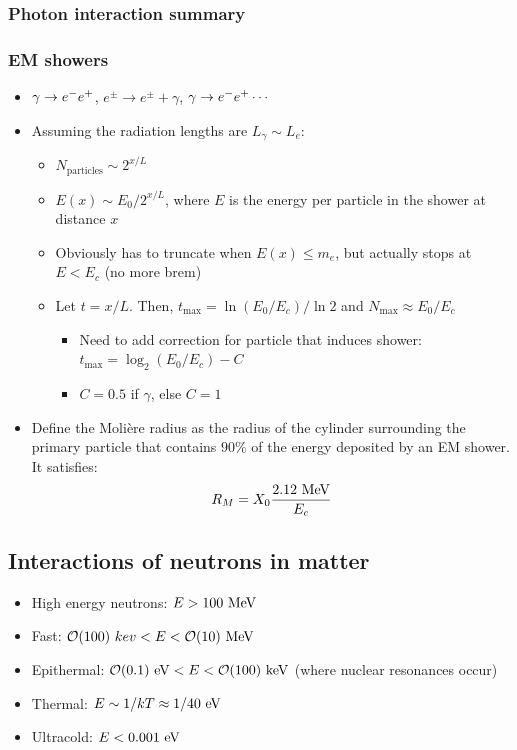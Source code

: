 \subsubsection{Photon interaction summary}


\subsubsection{EM showers}
\begin{itemize}
  \item $\gamma\rightarrow e^{-}e^{+}$, $e^\pm\rightarrow e^\pm+\gamma$, $\gamma\rightarrow e^{-}e^{+}\cdots$
  \item Assuming the radiation lengths are $L_\gamma\sim L_e$:
  \begin{itemize}
    \item $N_\text{particles}\sim 2^{x/L}$
    \item $E(x)\sim E_0/2^{x/L}$, where $E$ is the energy per particle in the shower at distance $x$
    \item Obviously has to truncate when $E(x)\leq m_e$, but actually stops at $E<E_c$ (no more brem)
    \item Let $t=x/L$. Then, $t_{\max} = \ln(E_0/E_c)/\ln2$ and $N_{\max}\approx E_0/E_c$
    \begin{itemize}
      \item Need to add correction for particle that induces shower: $t_{\max} = \log_2 (E_0/E_c) - C$
      \item $C = 0.5$ if $\gamma$, else $C = 1$ 
    \end{itemize}
  \end{itemize}
  \item Define the Moli\`ere radius as the radius of the cylinder surrounding the primary particle that contains $90\%$ of the energy deposited by an EM shower. It satisfies:
  \begin{equation}
    R_M = X_0 \frac{2.12~\text{MeV}}{E_c}
  \end{equation}
\end{itemize}

\subsection{Interactions of neutrons in matter}
\begin{itemize}
  \item High energy neutrons: $E>100~\text{MeV}$
  \item Fast: $\mathcal{O}(100)~kev < E < \mathcal{O}(10)~\text{MeV}$
  \item Epithermal: $\mathcal{O}(0.1)~\text{eV} < E <\mathcal{O}(100)~\text{keV}$ (where nuclear resonances occur)
  \item Thermal: $E\sim 1/kT \approx 1/40~\text{eV}$
  \item Ultracold: $E<0.001~\text{eV}$
\end{itemize}
